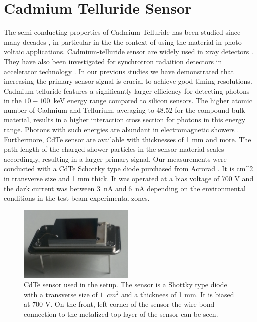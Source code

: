 %
%
%
\section{Cadmium Telluride Sensor}
\label{sec:siliconpad}
The semi-conducting properties of Cadmium-Telluride has been studied since many decades \cite{cdtegeneric}, 
in particular in the the context of using the material in photo voltaic applications.
Cadmium-telluride sensor are widely used in xray detectors \cite{cdtesensorsgeneric,cdtesensors1,cdtesensors2,cdtesensors3}. 
They have also been investigated for synchrotron radaition detectors in accelerator technology \cite{cdtelhc}.   
In our previous studies \cite{Anderson:2015gha,Ronzhin:2015pba,MCPShowerMaxPaper,Ronzhin2015288,Ronzhin201552,SiliconTiming} 
we have demonstrated that increasing the primary sensor signal is crucial to achieve good timing resolutions.  
Cadmium-telluride features a significantly larger efficiency for detecting photons in the $10-100$~keV energy range 
compared to silicon sensors. The higher atomic number of Cadmium and Tellurium, averaging to 48.52 for the compound bulk material, results in a higher interaction cross section for photons in this energy range. 
Photons with such energies are abundant in electromagnetic showers \cite{showercomposition}. 
Furthermore, CdTe sensor are available with thicknesses of 1 mm and more. 
The path-length of the charged shower particles in the sensor material scales accordingly, 
resulting in a larger primary signal.
%
Our measurements were conducted with a CdTe Schottky type diode purchased from Acrorad \cite{acrorad}. 
It is \unit{cm}^{2} in transverse size and 1 mm thick.
It was operated at a bias voltage of 700 V and the dark current was between $3$~nA 
and $6$~nA depending on the environmental conditions in the test beam experimental 
zones.     
%
\begin{figure}[htbp] 
\centering
\includegraphics[width=0.49\textwidth]{figures/CdTeSensor.png} 
\caption{CdTe sensor used in the setup. The sensor is a Shottky type diode with a transverse size 
of $1$~$\unit{cm}^{2}$ and a thicknees of 1 mm. It is biased at 700 V. 
On the front, left corner of the sensor the wire bond connection 
to the metalized top layer of the sensor can be seen.} 
\label{fig:CdTeSensor} 
\end{figure} 
